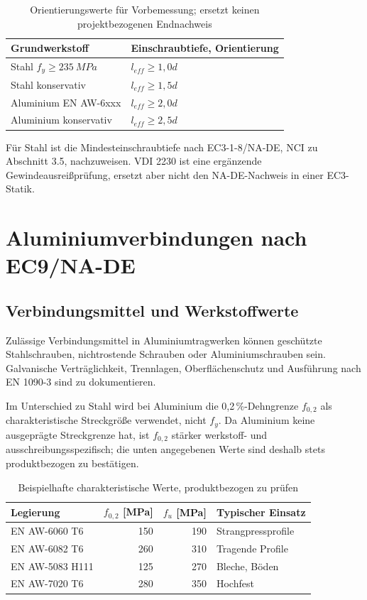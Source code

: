 \documentclass[10pt,a4paper]{article}
\begin{document}
\begin{table}[H]
\centering
\caption{Orientierungswerte für Vorbemessung; ersetzt keinen projektbezogenen Endnachweis}
\begin{tabular}{@{}ll@{}}
\toprule
\textbf{Grundwerkstoff} & \textbf{Einschraubtiefe, Orientierung} \\
\midrule
Stahl $f_y\geq\SI{235}{MPa}$ & $l_{eff}\geq1{,}0d$ \\
Stahl konservativ & $l_{eff}\geq1{,}5d$ \\
Aluminium EN AW-6xxx & $l_{eff}\geq2{,}0d$ \\
Aluminium konservativ & $l_{eff}\geq2{,}5d$ \\
\bottomrule
\end{tabular}
\end{table}

Für Stahl ist die Mindesteinschraubtiefe nach EC3-1-8/NA-DE, NCI zu Abschnitt 3.5, nachzuweisen. VDI 2230 ist eine ergänzende Gewindeausreißprüfung, ersetzt aber nicht den NA-DE-Nachweis in einer EC3-Statik.

\section{Aluminiumverbindungen nach EC9/NA-DE}

\subsection{Verbindungsmittel und Werkstoffwerte}
Zulässige Verbindungsmittel in Aluminiumtragwerken können geschützte Stahlschrauben, nichtrostende Schrauben oder Aluminiumschrauben sein. Galvanische Verträglichkeit, Trennlagen, Oberflächenschutz und Ausführung nach EN 1090-3 sind zu dokumentieren.

Im Unterschied zu Stahl wird bei Aluminium die 0,2\,\%-Dehngrenze $f_{0,2}$ als charakteristische Streckgröße verwendet, nicht $f_y$. Da Aluminium keine ausgeprägte Streckgrenze hat, ist $f_{0,2}$ stärker werkstoff- und ausschreibungsspezifisch; die unten angegebenen Werte sind deshalb stets produktbezogen zu bestätigen.

\begin{table}[H]
\centering
\caption{Beispielhafte charakteristische Werte, produktbezogen zu prüfen}
\begin{tabular}{@{}lrrl@{}}
\toprule
\textbf{Legierung} & $f_{0,2}$ [MPa] & $f_u$ [MPa] & \textbf{Typischer Einsatz} \\
\midrule
EN AW-6060 T6 & 150 & 190 & Strangpressprofile \\
EN AW-6082 T6 & 260 & 310 & Tragende Profile \\
EN AW-5083 H111 & 125 & 270 & Bleche, Böden \\
EN AW-7020 T6 & 280 & 350 & Hochfest \\
\bottomrule
\end{tabular}
\end{table}
\end{document}
